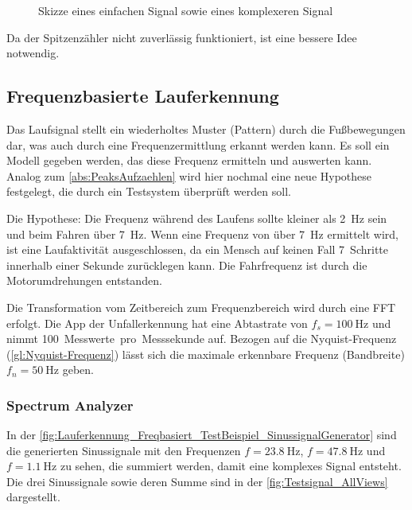 \begin{figure}
	\centering
	\hfill
	\caption{Skizze eines einfachen Signal sowie eines komplexeren Signal}
	\label{fig:Skizze_IdealUndEchtSignal}
\end{figure}

Da der Spitzenzähler nicht zuverlässig funktioniert, ist eine bessere Idee notwendig. 


\subsection{Frequenzbasierte Lauferkennung}

Das Laufsignal stellt ein wiederholtes Muster (Pattern) durch die Fußbewegungen dar, was auch durch eine Frequenzermittlung erkannt werden kann.
Es soll ein Modell gegeben werden, das diese Frequenz ermitteln und auswerten kann.
Analog zum \autoref{abs:PeaksAufzaehlen} wird hier nochmal eine neue Hypothese festgelegt, die durch ein Testsystem überprüft werden soll.

Die Hypothese: Die Frequenz während des Laufens sollte kleiner als \SI{2}{\hertz} sein und beim Fahren über \SI{7}{\hertz}. Wenn eine Frequenz von über \SI{7}{\hertz} ermittelt wird, ist eine Laufaktivität ausgeschlossen, da ein Mensch auf keinen Fall \SI{7}{Schritte} innerhalb einer Sekunde zurücklegen kann. Die Fahrfrequenz ist durch die Motorumdrehungen entstanden. 

Die Transformation vom Zeitbereich zum Frequenzbereich wird durch eine FFT erfolgt.
Die App der Unfallerkennung hat eine Abtastrate von $f_s = \SI{100}{\hertz}$ und nimmt \SI{100}{Messwerte pro Messsekunde} auf.
Bezogen auf die Nyquist-Frequenz (\autoref{gl:Nyquist-Frequenz}) lässt sich die maximale erkennbare Frequenz (Bandbreite) $f_n = \SI{50}{\hertz}$ geben.

\subsubsection{Spectrum Analyzer}
In der \autoref{fig:Lauferkennung_Freqbasiert_TestBeispiel_SinussignalGenerator} sind die generierten Sinussignale mit den Frequenzen $f=\SI{23,8}{\hertz}$, $f=\SI{47,8}{\hertz}$ und $f=\SI{1,1}{\hertz}$ zu sehen, die summiert werden, damit eine komplexes Signal entsteht. Die drei Sinussignale sowie deren Summe sind in der \autoref{fig:Testsignal_AllViews} dargestellt.

